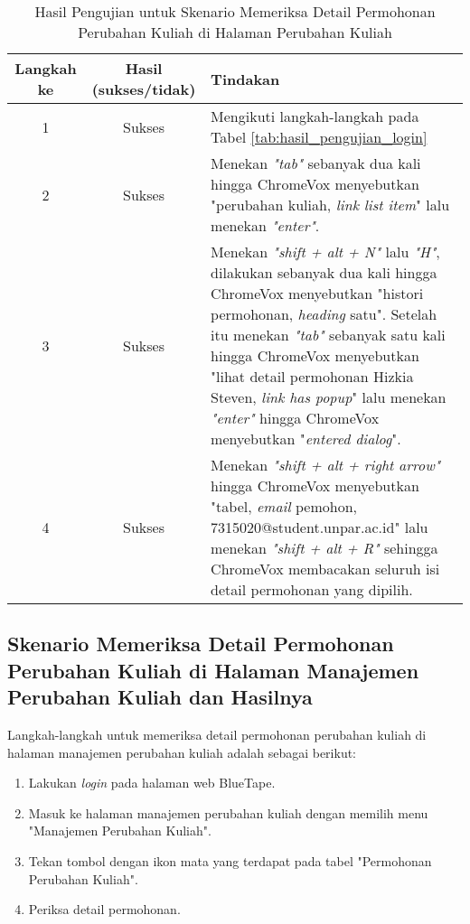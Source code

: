 \begin{table}[H]
    \centering 
    \caption{Hasil Pengujian untuk Skenario Memeriksa Detail Permohonan Perubahan Kuliah di Halaman Perubahan Kuliah}
    \label{tab:hasil_pengujian_memeriksa_detail_permohonan_perubahan_kuliah_di_halaman_perubahan_kuliah}
    \begin{tabular}{|c|c|p{10cm}|}
        \toprule
        Langkah ke & Hasil (sukses/tidak) & Tindakan \\

        \midrule
        1 & Sukses & Mengikuti langkah-langkah pada Tabel \ref{tab:hasil_pengujian_login} \\
        2 & Sukses & Menekan \textit{"tab"} sebanyak dua kali hingga ChromeVox menyebutkan "perubahan kuliah, \textit{link list item}" lalu menekan \textit{"enter"}. \\
        3 & Sukses & Menekan \textit{"shift + alt + N"} lalu \textit{"H"}, dilakukan sebanyak dua kali hingga ChromeVox menyebutkan "histori permohonan, \textit{heading} satu". Setelah itu menekan \textit{"tab"} sebanyak satu kali hingga ChromeVox menyebutkan "lihat detail permohonan Hizkia Steven, \textit{link has popup}" lalu menekan \textit{"enter"} hingga ChromeVox menyebutkan "\textit{entered dialog}". \\
        4 & Sukses & Menekan \textit{"shift + alt + right arrow"} hingga ChromeVox menyebutkan "tabel, \textit{email} pemohon, 7315020@student.unpar.ac.id" lalu menekan \textit{"shift + alt + R"} sehingga ChromeVox membacakan seluruh isi detail permohonan yang dipilih. \\

        \bottomrule

    \end{tabular}
\end{table}

\subsection{Skenario Memeriksa Detail Permohonan Perubahan Kuliah di Halaman Manajemen Perubahan Kuliah dan Hasilnya}
\label{subsec:skenario_memeriksa_detail_permohonan_perubahan_kuliah_di_halaman_manajemen_perubahan_kuliah}
Langkah-langkah untuk memeriksa detail permohonan perubahan kuliah di halaman manajemen perubahan kuliah adalah sebagai berikut:

\begin{enumerate}
    \item Lakukan \textit{login} pada halaman web BlueTape.
    \item Masuk ke halaman manajemen perubahan kuliah dengan memilih menu "Manajemen Perubahan Kuliah".
    \item Tekan tombol dengan ikon mata yang terdapat pada tabel "Permohonan Perubahan Kuliah".
    \item Periksa detail permohonan.
\end{enumerate}

